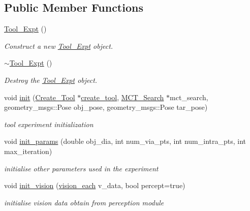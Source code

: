 \subsection*{Public Member Functions}
\begin{DoxyCompactItemize}
\item 
\mbox{\label{classTool__Expt_a6f244696f380875f00de3bfa4fd07403}} 
\hyperlink{classTool__Expt_a6f244696f380875f00de3bfa4fd07403}{Tool\+\_\+\+Expt} ()
\begin{DoxyCompactList}\small\item\em Construct a new \hyperlink{classTool__Expt}{Tool\+\_\+\+Expt} object. \end{DoxyCompactList}\item 
\mbox{\label{classTool__Expt_af70ca9eca501d73dc41e548b33463aa9}} 
\hyperlink{classTool__Expt_af70ca9eca501d73dc41e548b33463aa9}{$\sim$\+Tool\+\_\+\+Expt} ()
\begin{DoxyCompactList}\small\item\em Destroy the \hyperlink{classTool__Expt}{Tool\+\_\+\+Expt} object. \end{DoxyCompactList}\item 
void \hyperlink{classTool__Expt_ac7fc861acae5fc088acda4034cd1ef7b}{init} (\hyperlink{classCreate__Tool}{Create\+\_\+\+Tool} $\ast$\hyperlink{classTool__Expt_ae15dbe96d503e8c03cb86d9f8e58937c}{create\+\_\+tool}, \hyperlink{classMCT__Search}{M\+C\+T\+\_\+\+Search} $\ast$mct\+\_\+search, geometry\+\_\+msgs\+::\+Pose obj\+\_\+pose, geometry\+\_\+msgs\+::\+Pose tar\+\_\+pose)
\begin{DoxyCompactList}\small\item\em tool experiment initialization \end{DoxyCompactList}\item 
void \hyperlink{classTool__Expt_a9bd0a2a625f485202d48636fcc920f04}{init\+\_\+params} (double obj\+\_\+dia, int num\+\_\+via\+\_\+pts, int num\+\_\+intra\+\_\+pts, int max\+\_\+iteration)
\begin{DoxyCompactList}\small\item\em initialise other parameters used in the experiment \end{DoxyCompactList}\item 
void \hyperlink{classTool__Expt_a37cf2a6c1c96828464c9db13ac6a8577}{init\+\_\+vision} (\hyperlink{structvision__each}{vision\+\_\+each} v\+\_\+data, bool percept=true)
\begin{DoxyCompactList}\small\item\em initialise vision data obtain from perception module \end{DoxyCompactList}\item 

\end{DoxyCompactItemize}
